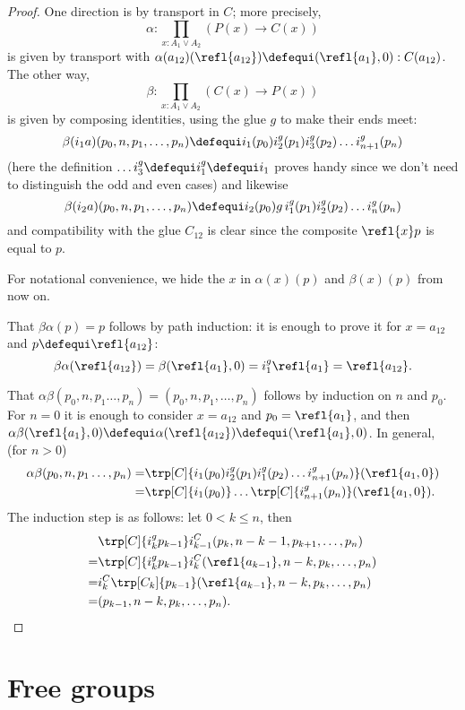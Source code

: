 \begin{proof}
One direction is by transport in $C$; more precisely,
$$\alpha:\prod_{x:A_1\vee A_2}(P(x)\to C(x))$$ is given by transport with $\alpha(a_{12})(\refl{a_{12}})\defequi(\refl{a_{1}},0):C(a_{12})$.
The other way,
$$\beta:\prod_{x:A_1\vee A_2}(C(x)\to P(x))$$ is given by composing identities, using the glue $g$ to make their ends meet:
$$\beta(i_1a)(p_0,n,p_1,\dots,p_n)\defequi i_1(p_0)i_2^g(p_1)i_3^g(p_2) \dots i_{n+1}^g(p_n)$$
(here the definition $\dots i_3^g\defequi i_1^g\defequi i_1$ proves handy since we don't need to distinguish the odd and even cases)
and likewise
$$\beta(i_2a)(p_0,n,p_1,\dots,p_n)\defequi i_2(p_0)g\,i_1^g(p_1)i_2^g(p_2) \dots i_{n}^g(p_n)$$ and compatibility with the glue $C_{12}$ is clear since the composite $\refl{x}p$ is equal to $p$.

For notational convenience, we hide the $x$ in $\alpha(x)(p)$ and $\beta(x)(p)$ from now on.

That $\beta\alpha(p)=p$ follows by path induction: it is enough to prove it for $x=a_{12}$ and
$p\defequi\refl{a_{12}}$:
$$\beta\alpha(\refl{a_{12}})=\beta(\refl{a_1},0)=i_1^g\refl{a_1}=\refl{a_{12}}.$$

That $\alpha\beta(p_0,n,p_1\dots,p_n)=(p_0,n,p_1,\dots,p_n)$ follows by induction on $n$ and $p_0$.  For $n=0$ it is enough to consider  $x=a_{12}$ and $p_0=\refl{a_1}$, and then
$\alpha\beta(\refl{a_1},0)\defequi\alpha(\refl{a_{12}})\defequi(\refl{a_1},0)$.  In general, (for $n>0$)
\begin{align*}
  \alpha\beta(p_0,n,p_1\dots,p_n)
=&\trp[C]{i_1(p_0)i_2^g(p_1)i_1^g(p_2) \dots i_{n+1}^g(p_n)}(\refl{a_1,0})\\
=&\trp[C]{i_1(p_0)}\dots\trp[C]{i_{n+1}^g(p_n)}(\refl{a_1,0}).
\end{align*}
  The induction step is as follows: let $0< k\leq n$, then
\begin{align*}
  &\trp[C]{i_k^gp_{k-1}}i^C_{k-1}(p_k,n-k-1,p_{k+1},\dots,p_n)\\
  =&\trp[C]{i_k^gp_{k-1}}i^C_k(\refl{a_{k-1}},n-k,p_k,\dots,p_n)\\
  =&i^C_k\trp[C_k]{p_{k-1}}(\refl{a_{k-1}},n-k,p_k,\dots,p_n)\\
  =&(p_{k-1},n-k,p_k,\dots,p_n).
\end{align*}
\end{proof}

\section{Free groups}
\label{sec:freegroups}

